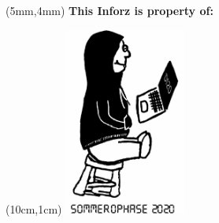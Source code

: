 \thispagestyle{empty}

\begin{textblock*}{10cm}(5mm,4mm)
    \normalsize \textbf{This Inforz is property of:}
\end{textblock*}

\begin{textblock*}{4cm}(10cm,1cm)
    \includegraphics[width=4cm]{../grafik/wesen/wesen_ophase}
\end{textblock*}

